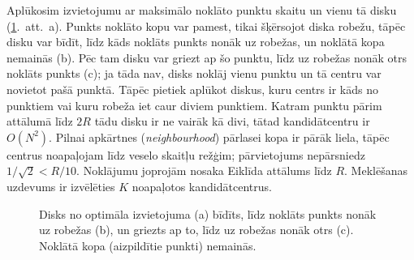 \documentclass[conference]{IEEEtran}
\begin{document}
Aplūkosim izvietojumu ar maksimālo noklāto punktu skaitu un vienu tā disku (\ref{fig:shift}.~att.~a).
Punkts noklāto kopu var pamest, tikai šķērsojot diska robežu, tāpēc disku var bīdīt, līdz kāds noklāts punkts nonāk uz robežas, un noklātā kopa nemainās (b).
Pēc tam disku var griezt ap šo punktu, līdz uz robežas nonāk otrs noklāts punkts (c); ja tāda nav, disks noklāj vienu punktu un tā centru var novietot pašā punktā.
Tāpēc pietiek aplūkot diskus, kuru centrs ir kāds no punktiem vai kuru robeža iet caur diviem punktiem.
Katram punktu pārim attālumā līdz $2R$ tādu disku ir ne vairāk kā divi, tātad kandidātcentru ir $O(N^2)$.
Pilnai apkārtnes (\textit{neighbourhood}) pārlasei kopa ir pārāk liela, tāpēc centrus noapaļojam līdz veselo skaitļu režģim; pārvietojums nepārsniedz $1/\sqrt{2}<R/10$.
Noklājumu joprojām nosaka Eiklīda attālums līdz $R$.
Meklēšanas uzdevums ir izvēlēties $K$ noapaļotos kandidātcentrus.

\begin{figure}[!t]
\centering
{}
\caption{Disks no optimāla izvietojuma (a) bīdīts, līdz noklāts punkts nonāk uz robežas (b), un griezts ap to, līdz uz robežas nonāk otrs (c).
Noklātā kopa (aizpildītie punkti) nemainās.}
\label{fig:shift}
\end{figure}
\end{document}

